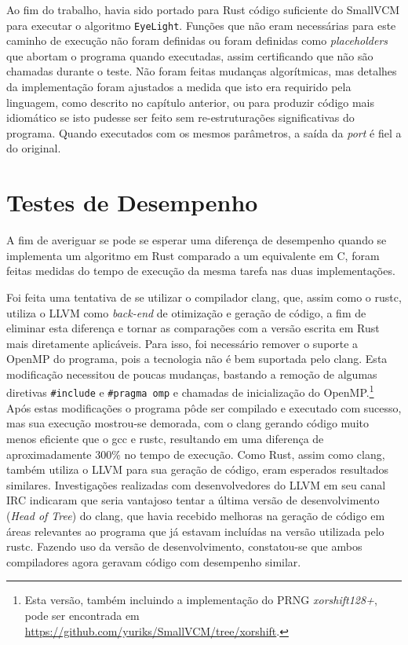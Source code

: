 \documentclass[tg]{mdtufsm}
\def\Cpp{{C\nolinebreak[4]\raisebox{.20ex}{\small\bf++}}}
\begin{document}
Ao fim do trabalho, havia sido portado para Rust código suficiente do SmallVCM para executar o algoritmo \texttt{EyeLight}. Funções que não eram necessárias para este caminho de execução não foram definidas ou foram definidas como \emph{placeholders} que abortam o programa quando executadas, assim certificando que não são chamadas durante o teste. Não foram feitas mudanças algorítmicas, mas detalhes da implementação foram ajustados a medida que isto era requirido pela linguagem, como descrito no capítulo anterior, ou para produzir código mais idiomático se isto pudesse ser feito sem re-estruturações significativas do programa. Quando executados com os mesmos parâmetros, a saída da \emph{port} é fiel a do original.

\section{Testes de Desempenho}

A fim de averiguar se pode se esperar uma diferença de desempenho quando se implementa um algoritmo em Rust comparado a um equivalente em \Cpp, foram feitas medidas do tempo de execução da mesma tarefa nas duas implementações.

Foi feita uma tentativa de se utilizar o compilador clang, que, assim como o rustc, utiliza o LLVM como \emph{back-end} de otimização e geração de código, a fim de eliminar esta diferença e tornar as comparações com a versão escrita em Rust mais diretamente aplicáveis. Para isso, foi necessário remover o suporte a OpenMP do programa, pois a tecnologia não é bem suportada pelo clang. Esta modificação necessitou de poucas mudanças, bastando a remoção de algumas diretivas \texttt{\#include} e \texttt{\#pragma omp} e chamadas de inicialização do OpenMP.\footnote{Esta versão, também incluindo a implementação do PRNG \emph{xorshift128+}, pode ser encontrada em \url{https://github.com/yuriks/SmallVCM/tree/xorshift}.} Após estas modificações o programa pôde ser compilado e executado com sucesso, mas sua execução mostrou-se demorada, com o clang gerando código muito menos eficiente que o gcc e rustc, resultando em uma diferença de aproximadamente 300\% no tempo de execução. Como Rust, assim como clang, também utiliza o LLVM para sua geração de código, eram esperados resultados similares. Investigações realizadas com desenvolvedores do LLVM em seu canal IRC indicaram que seria vantajoso tentar a última versão de desenvolvimento (\emph{Head of Tree}) do clang, que havia recebido melhoras na geração de código em áreas relevantes ao programa que já estavam incluídas na versão utilizada pelo rustc. Fazendo uso da versão de desenvolvimento, constatou-se que ambos compiladores agora geravam código com desempenho similar.
\end{document}
